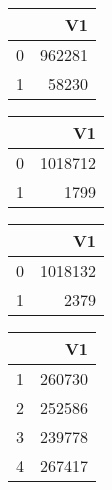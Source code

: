 \bigskip\bigskip
\centering
\begin{tabular}{rr}
  \hline
 & V1 \\ 
  \hline
0 & 962281 \\ 
  1 & 58230 \\ 
   \hline
\end{tabular}

\bigskip\bigskip
\centering
\begin{tabular}{rr}
  \hline
 & V1 \\ 
  \hline
0 & 1018712 \\ 
  1 & 1799 \\ 
   \hline
\end{tabular}

\bigskip\bigskip
\centering
\begin{tabular}{rr}
  \hline
 & V1 \\ 
  \hline
0 & 1018132 \\ 
  1 & 2379 \\ 
   \hline
\end{tabular}

\bigskip\bigskip
\centering
\begin{tabular}{rr}
  \hline
 & V1 \\ 
  \hline
1 & 260730 \\ 
  2 & 252586 \\ 
  3 & 239778 \\ 
  4 & 267417 \\ 
   \hline
\end{tabular}

